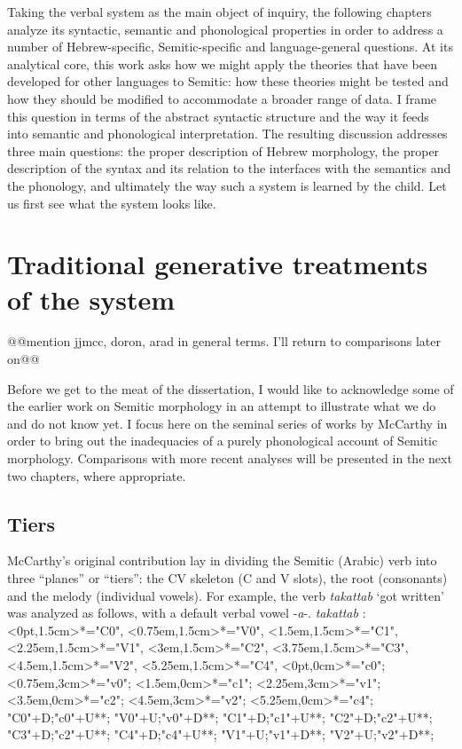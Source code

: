 Taking the verbal system as the main object of inquiry, the following chapters analyze its syntactic, semantic and phonological properties in order to address a number of Hebrew-specific, Semitic-specific and language-general questions. At its analytical core, this work asks how we might apply the theories that have been developed for other languages to Semitic: how these theories might be tested and how they should be modified to accommodate a broader range of data. I frame this question in terms of the abstract syntactic structure and the way it feeds into semantic and phonological interpretation. The resulting discussion addresses three main questions: the proper description of Hebrew morphology, the proper description of the syntax and its relation to the interfaces with the semantics and the phonology, and ultimately the way such a system is learned by the child. Let us first see what the system looks like.






\section{Traditional generative treatments of the system} \label{sec:jjmcc}

@@mention jjmcc, doron, arad in general terms. I'll return to comparisons later on@@

Before we get to the meat of the dissertation, I would like to acknowledge some of the earlier work on Semitic morphology in an attempt to illustrate what we do and do not know yet. I focus here on the seminal series of works by McCarthy \citep{jjmcc79,jjmcc81,jjmcc89li,jjmccprince90} in order to bring out the inadequacies of a purely phonological account of {Semitic morphology}. Comparisons with more recent analyses will be presented in the next two chapters, where appropriate.

	\subsection{Tiers}
McCarthy's original contribution lay in dividing the Semitic (Arabic) verb into three ``planes'' or ``tiers'': the CV skeleton (C and V slots), the root (consonants) and the melody (individual vowels). For example, the verb \emph{takattab} `got written' was analyzed as follows, with a default verbal vowel -\emph{a}-.
\ex\label{ex:jjmcc-takattab}\emph{takattab} \citep[392]{jjmcc81}:\\
\xy
<0pt,1.5cm>*="C0",
<0.75em,1.5cm>*="V0",
<1.5em,1.5cm>*="C1",
<2.25em,1.5cm>*="V1",
<3em,1.5cm>*="C2",
<3.75em,1.5cm>*="C3",
<4.5em,1.5cm>*="V2",
<5.25em,1.5cm>*="C4",
<0pt,0cm>*="c0";
<0.75em,3cm>*="v0";
<1.5em,0cm>*="c1";
<2.25em,3cm>*="v1";
<3.5em,0cm>*="c2";
<4.5em,3cm>*="v2";
<5.25em,0cm>*="c4";
"C0"+D;"c0"+U**\dir{-};
"V0"+U;"v0"+D**\dir{-};
"C1"+D;"c1"+U**\dir{-};
"C2"+D;"c2"+U**\dir{-};
"C3"+D;"c2"+U**\dir{-};
"C4"+D;"c4"+U**\dir{-};
"V1"+U;"v1"+D**\dir{-};
"V2"+U;"v2"+D**\dir{-};
\endxy
\xe

